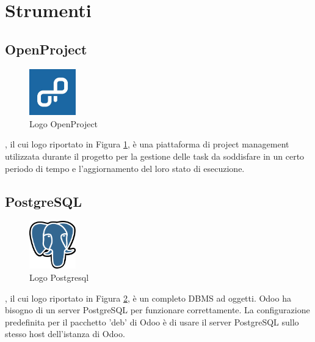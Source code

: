 \section{Strumenti}
\subsection{OpenProject}
\begin{figure}[H]
	\begin{center} \includegraphics[width=2cm]{figures/openproject}
		\caption[Logo OpenProject]{Logo OpenProject}  
		\label{openproject} 
	\end{center}
\end{figure}
, il cui logo riportato in Figura \ref{openproject}, è una piattaforma di project management utilizzata durante il progetto per la gestione delle task da soddisfare in un certo periodo di tempo e l'aggiornamento del loro stato di esecuzione.

\subsection{PostgreSQL}
\begin{figure}[H]
	\begin{center} \includegraphics[width=2cm]{figures/Logo_Postgresql}
		\caption[Logo Postgresql]{Logo Postgresql}  
		\label{logo_postgresql} 
	\end{center}
\end{figure}
, il cui logo riportato in Figura \ref{logo_postgresql}, è un completo DBMS ad oggetti. Odoo ha bisogno di un server PostgreSQL per funzionare correttamente. La configurazione predefinita per il pacchetto 'deb' di Odoo è di usare il server PostgreSQL sullo stesso host dell'istanza di Odoo.


